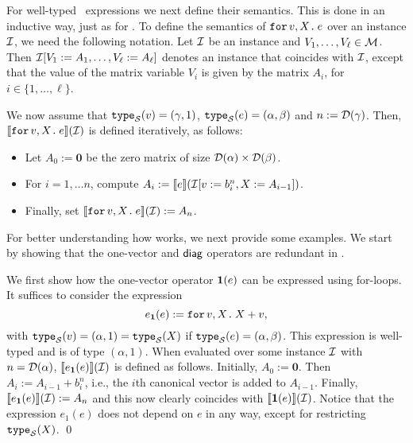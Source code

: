 For well-typed \langfor\ expressions we next define their semantics. This is done in an inductive way, just as for \lang. To define the semantics of $\texttt{for}\, v,X \texttt{.}\, e$ over an instance $\mathcal{I}$, we need the following notation. Let $\mathcal{I}$ be an instance and $V_1,\ldots,V_\ell\in \mathcal{M}$. Then $\mathcal{I}[V_1 := A_1, \ldots, V_\ell:=A_\ell]$ denotes an instance that coincides with $\mathcal{I}$, except that the value of the matrix variable $V_i$ is given by the matrix $A_i$, for $i\in\lbrace 1, \ldots, \ell\rbrace$.

We now assume that
$\texttt{type}_{\mathcal{S}}(v)= (\gamma,1)$, $\texttt{type}_{\mathcal{S}}(e) = (\alpha,\beta)$ and $n := \mathcal{D}(\gamma)$. Then, $\llbracket \texttt{for}\, v,X \texttt{.}\, e \rrbracket(\mathcal{I})$ is defined iteratively, as follows:
\begin{itemize}
\item Let $A_0 := \mathbf{0}$ be the zero matrix of size $\mathcal{D}(\alpha)\times \mathcal{D}(\beta)$.
\item For $i=1,\ldots n$, compute $A_i:= \llbracket e \rrbracket(\mathcal{I}[v := b^{n}_i, X:= A_{i-1}])$.
\item Finally, set $\llbracket \texttt{for}\, v,X \texttt{.}\, e \rrbracket(\mathcal{I}):= A_{n}$.
\end{itemize}

For better understanding how \langfor  works, we next provide some  examples.
We start by showing that the one-vector and $\textsf{diag}$ operators are redundant
in \langfor.

\begin{example}\label{ex:onevec}
We first show how the one-vector operator $\mathbf{1}(e)$ can be expressed using for-loops.
It suffices to consider the expression
$$e_{\mathbf{1}}(e):=\texttt{for}\, v,X \texttt{.}\, X+v,$$
with $\texttt{type}_{\mathcal{S}}(v)=(\alpha,1)=\texttt{type}_{\mathcal{S}}(X)$ if $\texttt{type}_{\mathcal{S}}(e)=(\alpha,\beta)$. This expression is well-typed
and is of type $(\alpha,1)$. When evaluated over some instance $\mathcal{I}$ with $n=\mathcal{D}(\alpha)$, $\llbracket e_{\mathbf{1}}(e) \rrbracket(\mathcal{I})$ is defined as follows.
Initially, $A_0:=\mathbf{0}$. Then $A_i:=A_{i-1}+b_i^n$, i.e., the $i$th canonical vector is added to $A_{i-1}$.
Finally, $\llbracket e_{\mathbf{1}}(e) \rrbracket(\mathcal{I}):=A_n$ and this now clearly coincides with $\llbracket \mathbf{1}(e) \rrbracket(\mathcal{I})$. Notice that the expression $e_1(e)$ does not depend on $e$ in any way, except for restricting $\texttt{type}_{\mathcal{S}}(X)$. \qed
\end{example}

